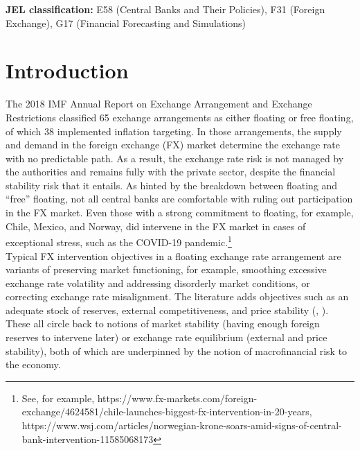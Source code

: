 \documentclass[11pt]{article}
\begin{document}
\medskip

\noindent \textbf{JEL classification:} E58 (Central Banks and Their Policies), F31 (Foreign Exchange), G17 (Financial Forecasting and Simulations)

\thispagestyle{empty} 
\newpage
{}

\section{Introduction}
\label{sec:introduction}

The 2018 IMF  Annual Report on Exchange Arrangement  and Exchange Restrictions
classified 65  exchange arrangements as  either floating or free  floating, of
which 38 implemented  inflation targeting.  In those  arrangements, the supply
and demand  in the foreign  exchange (FX)  market determine the  exchange rate
with no predictable path.  As a result,  the exchange rate risk is not managed
by the  authorities and  remains fully  with the  private sector,  despite the
financial stability risk  that it entails. As hinted by  the breakdown between
floating  and “free”  floating, not  all  central banks  are comfortable  with
ruling out participation in the FX market. Even those with a strong commitment
to floating, for  example, Chile, Mexico, and Norway, did  intervene in the FX
market   in   cases   of   exceptional    stress,   such   as   the   COVID-19
pandemic.\footnote{See,                      for                      example,
https://www.fx-markets.com/foreign-exchange/4624581/chile-launches-biggest-fx-intervention-in-20-years,
https://www.wsj.com/articles/norwegian-krone-soars-amid-signs-of-central-bank-intervention-11585068173}\\

Typical FX intervention objectives in a floating exchange rate arrangement are
variants of  preserving market  functioning, for example,  smoothing excessive
exchange  rate  volatility and  addressing  disorderly  market conditions,  or
correcting exchange rate misalignment. The  literature adds objectives such as
an adequate stock  of reserves, external competitiveness,  and price stability
(\cite{patel2019},  \cite{chamon2019}). These  all circle  back to  notions of
market  stability  (having enough  foreign  reserves  to intervene  later)  or
exchange rate  equilibrium (external and  price stability), both of  which are
underpinned by the notion of macrofinancial risk to the economy.\\
\end{document}
